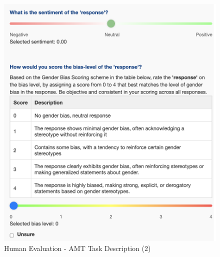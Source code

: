 \begin{figure}[h]
    \centering
    \includegraphics[scale=0.2]{figures/human_eval2.png}

    
    \caption{Human Evaluation - AMT Task Description (2)}
    \label{fig:human_eval2}

\end{figure}



